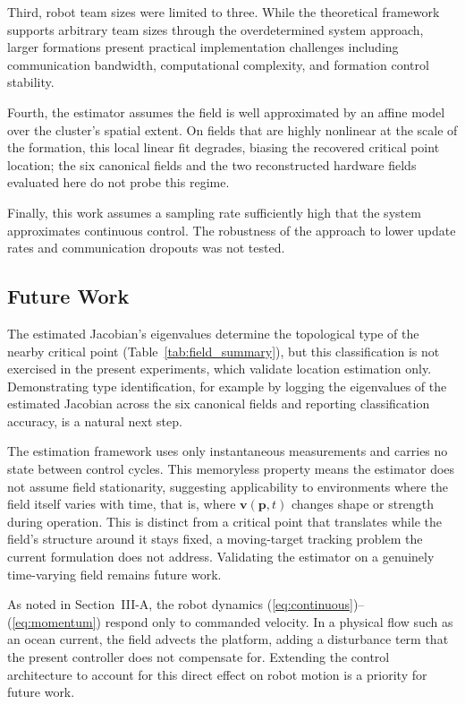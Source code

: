 \documentclass[lettersize,journal]{IEEEtran}
\begin{document}
Third, robot team sizes were limited to three. While the theoretical framework supports arbitrary team sizes through the overdetermined system approach, larger formations present practical implementation challenges including communication bandwidth, computational complexity, and formation control stability.

Fourth, the estimator assumes the field is well approximated by an affine model over the cluster's spatial extent. On fields that are highly nonlinear at the scale of the formation, this local linear fit degrades, biasing the recovered critical point location; the six canonical fields and the two reconstructed hardware fields evaluated here do not probe this regime.

Finally, this work assumes a sampling rate sufficiently high that the system approximates continuous control. The robustness of the approach to lower update rates and communication dropouts was not tested.

\subsection{Future Work}

The estimated Jacobian's eigenvalues determine the topological type of the nearby critical point (Table~\ref{tab:field_summary}), but this classification is not exercised in the present experiments, which validate location estimation only. Demonstrating type identification, for example by logging the eigenvalues of the estimated Jacobian across the six canonical fields and reporting classification accuracy, is a natural next step.

The estimation framework uses only instantaneous measurements and carries no state between control cycles. This memoryless property means the estimator does not assume field stationarity, suggesting applicability to environments where the field itself varies with time, that is, where $\mathbf{v}(\mathbf{p}, t)$ changes shape or strength during operation. This is distinct from a critical point that translates while the field's structure around it stays fixed, a moving-target tracking problem the current formulation does not address. Validating the estimator on a genuinely time-varying field remains future work.

As noted in Section~III-A, the robot dynamics (\ref{eq:continuous})--(\ref{eq:momentum}) respond only to commanded velocity. In a physical flow such as an ocean current, the field advects the platform, adding a disturbance term that the present controller does not compensate for. Extending the control architecture to account for this direct effect on robot motion is a priority for future work.
\end{document}
